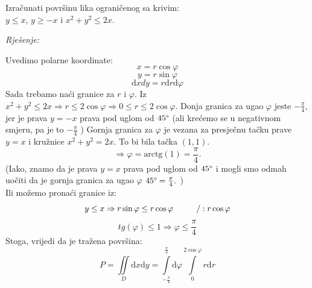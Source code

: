 \documentclass[a4paper,11pt]{article}
\newcommand{\arctg}[1]{\text{arctg}(#1) }
\begin{document}
 
 
 \begin{tcolorbox}[colback=brown!35!white,colframe=white!75!white,title= $$\bullet \bullet \bullet$$]
         \begin{zadatak}
Izračunati površinu lika ograničenog sa krivim:\\ $y\leq x$, $y\geq -x$ i $x^{2} + y^{2} \leq 2x.$

\end{zadatak}
\end{tcolorbox}
\emph{Rješenje: }
\begin{center}
\end{center}
Uvedimo polarne koordinate:
$$x = r \cos{\varphi}$$
$$y = r \sin{\varphi}$$
 $$\mathrm dxdy = r  \mathrm d r  \mathrm d\varphi$$
 Sada trebamo naći granice za $r$  i $\varphi.$ 
 Iz $x^{2} + y^{2} \leq 2x \Rightarrow r\leq 2\cos{\varphi} \Rightarrow 0\leq r \leq 2\cos{\varphi}. $
 Donja granica za ugao $\varphi$ jeste $-\frac{\pi}{4}$, jer je prava $y= -x$ prava pod uglom od $45 \degree$ (ali krećemo se u negativnom smjeru, pa je to $-\frac{\pi}{4}$ )
  Gornja granica za $\varphi$  je  vezana za presječnu tačku prave $y = x$ i kružnice $x^{2} + y^{2} = 2x$. To bi bila tačka $(1,1 ).$ 
$$\Rightarrow \varphi = \arctg{1} = \frac{\pi}{4}.$$
(Iako, znamo da je prava $y=x$ prava pod uglom od $45 \degree$ i mogli smo odmah uočiti da je gornja granica za ugao $\varphi$ $45 \degree = \frac{\pi}{4}.$ )
\\ Ili možemo pronaći granice iz: $$y \leq x \Rightarrow r\sin{\varphi} \leq r\cos{\varphi} \hspace{1 cm} / :r\cos{\varphi}$$
$$tg(\varphi) \leq 1 \Rightarrow \varphi \leq \frac{\pi}{4}$$
Stoga, vrijedi da je tražena površina:
$$P = \iint \limits_{D}   \mathrm dx \mathrm dy = \int\limits_{-\frac{\pi}{4}}^{\frac{\pi}{4}} \mathrm d \varphi  \int\limits_{0}^{2\cos{\varphi}} r\mathrm dr$$ 
\end{document}
